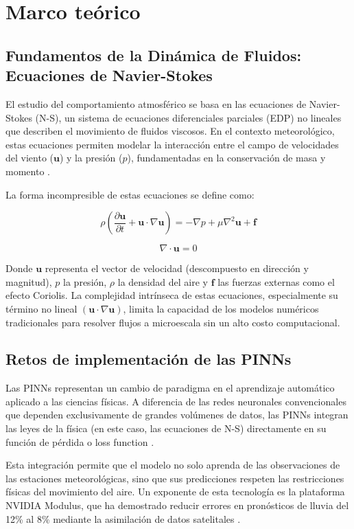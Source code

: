 \chapter{Marco teórico}

\section{Fundamentos de la Dinámica de Fluidos: Ecuaciones de Navier-Stokes}

El estudio del comportamiento atmosférico se basa en las ecuaciones de Navier-Stokes (N-S), un sistema de ecuaciones diferenciales parciales (EDP) no lineales que describen el movimiento de fluidos viscosos. En el contexto meteorológico, estas ecuaciones permiten modelar la interacción entre el campo de velocidades del viento ($\mathbf{u}$) y la presión ($p$), fundamentadas en la conservación de masa y momento \citep{lukaszewicz2016navier}.

La forma incompresible de estas ecuaciones se define como:

$$\rho \left( \frac{\partial \mathbf{u}}{\partial t} + \mathbf{u} \cdot \nabla \mathbf{u} \right) = -\nabla p + \mu \nabla^2 \mathbf{u} + \mathbf{f}$$

$$\nabla \cdot \mathbf{u} = 0$$

Donde $\mathbf{u}$ representa el vector de velocidad (descompuesto en dirección y magnitud), $p$ la presión, $\rho$ la densidad del aire y $\mathbf{f}$ las fuerzas externas como el efecto Coriolis. La complejidad intrínseca de estas ecuaciones, especialmente su término no lineal $(\mathbf{u} \cdot \nabla \mathbf{u})$, limita la capacidad de los modelos numéricos tradicionales para resolver flujos a microescala sin un alto costo computacional.

\section{Retos de implementación de las PINNs}

Las PINNs representan un cambio de paradigma en el aprendizaje automático aplicado a las ciencias físicas. A diferencia de las redes neuronales convencionales que dependen exclusivamente de grandes volúmenes de datos, las PINNs integran las leyes de la física (en este caso, las ecuaciones de N-S) directamente en su función de pérdida o loss function \citep{raissi2019physics}.

Esta integración permite que el modelo no solo aprenda de las observaciones de las estaciones meteorológicas, sino que sus predicciones respeten las restricciones físicas del movimiento del aire. Un exponente de esta tecnología es la plataforma NVIDIA Modulus, que ha demostrado reducir errores en pronósticos de lluvia del 12\% al 8\% mediante la asimilación de datos satelitales \citep{nvidia2023modulus}.

